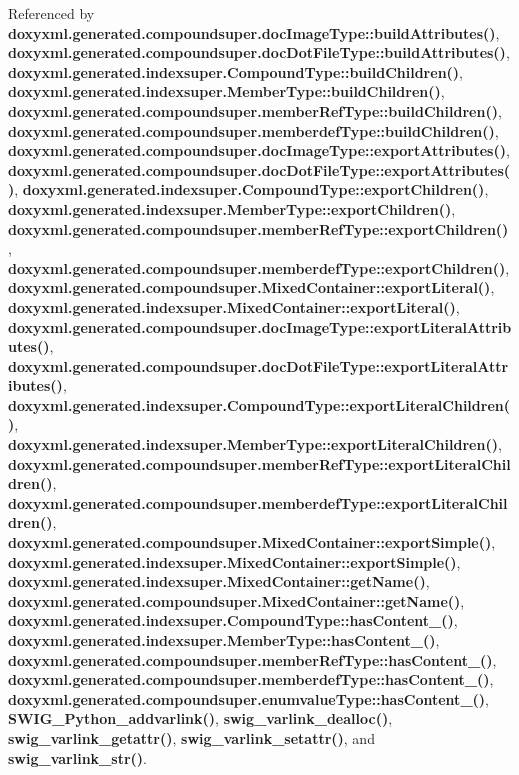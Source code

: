 Referenced by {\bf doxyxml.\+generated.\+compoundsuper.\+doc\+Image\+Type\+::build\+Attributes()}, {\bf doxyxml.\+generated.\+compoundsuper.\+doc\+Dot\+File\+Type\+::build\+Attributes()}, {\bf doxyxml.\+generated.\+indexsuper.\+Compound\+Type\+::build\+Children()}, {\bf doxyxml.\+generated.\+indexsuper.\+Member\+Type\+::build\+Children()}, {\bf doxyxml.\+generated.\+compoundsuper.\+member\+Ref\+Type\+::build\+Children()}, {\bf doxyxml.\+generated.\+compoundsuper.\+memberdef\+Type\+::build\+Children()}, {\bf doxyxml.\+generated.\+compoundsuper.\+doc\+Image\+Type\+::export\+Attributes()}, {\bf doxyxml.\+generated.\+compoundsuper.\+doc\+Dot\+File\+Type\+::export\+Attributes()}, {\bf doxyxml.\+generated.\+indexsuper.\+Compound\+Type\+::export\+Children()}, {\bf doxyxml.\+generated.\+indexsuper.\+Member\+Type\+::export\+Children()}, {\bf doxyxml.\+generated.\+compoundsuper.\+member\+Ref\+Type\+::export\+Children()}, {\bf doxyxml.\+generated.\+compoundsuper.\+memberdef\+Type\+::export\+Children()}, {\bf doxyxml.\+generated.\+compoundsuper.\+Mixed\+Container\+::export\+Literal()}, {\bf doxyxml.\+generated.\+indexsuper.\+Mixed\+Container\+::export\+Literal()}, {\bf doxyxml.\+generated.\+compoundsuper.\+doc\+Image\+Type\+::export\+Literal\+Attributes()}, {\bf doxyxml.\+generated.\+compoundsuper.\+doc\+Dot\+File\+Type\+::export\+Literal\+Attributes()}, {\bf doxyxml.\+generated.\+indexsuper.\+Compound\+Type\+::export\+Literal\+Children()}, {\bf doxyxml.\+generated.\+indexsuper.\+Member\+Type\+::export\+Literal\+Children()}, {\bf doxyxml.\+generated.\+compoundsuper.\+member\+Ref\+Type\+::export\+Literal\+Children()}, {\bf doxyxml.\+generated.\+compoundsuper.\+memberdef\+Type\+::export\+Literal\+Children()}, {\bf doxyxml.\+generated.\+compoundsuper.\+Mixed\+Container\+::export\+Simple()}, {\bf doxyxml.\+generated.\+indexsuper.\+Mixed\+Container\+::export\+Simple()}, {\bf doxyxml.\+generated.\+indexsuper.\+Mixed\+Container\+::get\+Name()}, {\bf doxyxml.\+generated.\+compoundsuper.\+Mixed\+Container\+::get\+Name()}, {\bf doxyxml.\+generated.\+indexsuper.\+Compound\+Type\+::has\+Content\+\_\+()}, {\bf doxyxml.\+generated.\+indexsuper.\+Member\+Type\+::has\+Content\+\_\+()}, {\bf doxyxml.\+generated.\+compoundsuper.\+member\+Ref\+Type\+::has\+Content\+\_\+()}, {\bf doxyxml.\+generated.\+compoundsuper.\+memberdef\+Type\+::has\+Content\+\_\+()}, {\bf doxyxml.\+generated.\+compoundsuper.\+enumvalue\+Type\+::has\+Content\+\_\+()}, {\bf S\+W\+I\+G\+\_\+\+Python\+\_\+addvarlink()}, {\bf swig\+\_\+varlink\+\_\+dealloc()}, {\bf swig\+\_\+varlink\+\_\+getattr()}, {\bf swig\+\_\+varlink\+\_\+setattr()}, and {\bf swig\+\_\+varlink\+\_\+str()}.

